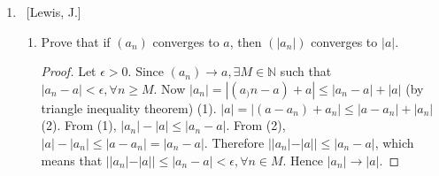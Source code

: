 \documentclass[10pt]{article}
\begin{document}
\begin{enumerate}
\begin{proof}
Step 0: Consider $b_n = \frac{a_n + a_{n+1}}{2}$.  Then
    \begin{align*}
    |b_n-a| &= |\frac{a_n + a_{n+1}}{2}-a|\\
    &=\left|\frac{a_n + a_{n+1}}{2}-\frac{a}{1}\right|\\
    &=\left|\frac{a_n + a_{n+1}}{2}-(\frac{a}{1}\cdot\frac{2}{2})\right|\\
    &=\left|\frac{a_n+a_{n+1}-2a}{2}\right|\\
    &=\left|\frac{(a_n-a)+(a_{n+1}-a)}{2}\right|\\
    &\leq \left|\frac{a_n-a}{2}|+|\frac{a_{n+1}-a}{2}\right|\\
    &< \frac{\epsilon}{2}+\frac{\epsilon}{2}\\
    &=\epsilon.\\
    \end{align*}

Step 1: Let $\epsilon > 0$.  

Step 2:  Since $(a_n) \rightarrow a$, $\forall \epsilon > 0, \exists N \in \mathbb{N}$ such that whenever $n \geq N, |a_n-a| < \epsilon$. Also, it can be said that since $n+1 > n \geq N, |a_{n+1} - a| < \epsilon$.

Step 3: Let $n \geq N$. 

Step 4: Consider 
    \begin{align*}
    |b_n-a| &= |\frac{a_n + a_{n+1}}{2}-a|\\
    &=\left|\frac{a_n + a_{n+1}}{2}-\frac{a}{1}\right|\\
    &=\left|\frac{a_n + a_{n+1}}{2}-(\frac{a}{1}\cdot\frac{2}{2})\right|\\
    &=\left|\frac{a_n+a_{n+1}-2a}{2}\right|\\
    &=\left|\frac{(a_n-a)+(a_{n+1}-a)}{2}\right|\\
    &\leq \left|\frac{a_n-a}{2}|+|\frac{a_{n+1}-a}{2}\right|\\
    &< \frac{\epsilon}{2}+\frac{\epsilon}{2}\\
    &=\epsilon.\\
    \end{align*}

Therefore $(b_n) \rightarrow a$.
\end{proof}
	
\item  ~[Lewis, J.]

	\begin{enumerate}
	
	\item  Prove that if $(a_n)$ converges to $a$, then $(|a_n|)$ converges to $|a|$.
\begin{proof}
 Let $\epsilon > 0$.  Since $(a_n) \rightarrow a, \exists M \in \mathbb{N}$ such that $|a_n-a| < \epsilon, \forall n \geq M$.  Now $|a_n| = |(a_)n-a)+a| \leq |a_n-a| + |a|$ (by triangle inequality theorem) (1).  $|a| = |(a-a_n)+a_n| \leq |a-a_n| + |a_n|$ (2). From (1), $|a_n| - |a| \leq |a_n-a|$.  From (2), $|a| - |a_n| \leq |a-a_n| = |a_n-a|$.  Therefore $||a_n|-|a|| \leq |a_n-a|$, which means that $||a_n|-|a|| \leq |a_n-a| < \epsilon, \forall n \in M$.  Hence $|a_n| \rightarrow |a|$.
\end{proof}
 

\end{enumerate}
\end{enumerate}
\end{document}
